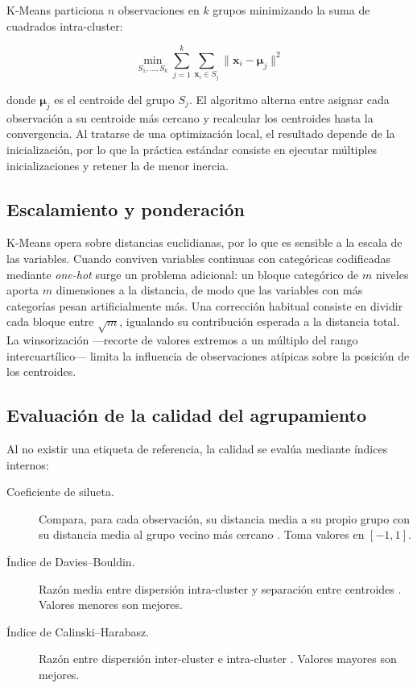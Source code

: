 K-Means \cite{macqueen1967some, lloyd1982least} particiona $n$ observaciones en $k$
grupos minimizando la suma de cuadrados intra-cluster:

\begin{equation}
\min_{S_1,\dots,S_k} \sum_{j=1}^{k} \sum_{\mathbf{x}_i \in S_j} \|\mathbf{x}_i - \boldsymbol{\mu}_j\|^2
\end{equation}

donde $\boldsymbol{\mu}_j$ es el centroide del grupo $S_j$. El algoritmo alterna
entre asignar cada observación a su centroide más cercano y recalcular los
centroides hasta la convergencia. Al tratarse de una optimización local, el
resultado depende de la inicialización, por lo que la práctica estándar consiste en
ejecutar múltiples inicializaciones y retener la de menor inercia.

\subsection{Escalamiento y ponderación}

K-Means opera sobre distancias euclidianas, por lo que es sensible a la escala de
las variables. Cuando conviven variables continuas con categóricas codificadas
mediante \emph{one-hot} surge un problema adicional: un bloque categórico de $m$
niveles aporta $m$ dimensiones a la distancia, de modo que las variables con más
categorías pesan artificialmente más. Una corrección habitual consiste en dividir
cada bloque entre $\sqrt{m}$, igualando su contribución esperada a la distancia
total. La winsorización —recorte de valores extremos a un múltiplo del rango
intercuartílico— limita la influencia de observaciones atípicas sobre la posición de
los centroides.

\subsection{Evaluación de la calidad del agrupamiento}

Al no existir una etiqueta de referencia, la calidad se evalúa mediante índices
internos:

\begin{description}
    \item[Coeficiente de silueta.] Compara, para cada observación, su distancia media
    a su propio grupo con su distancia media al grupo vecino más cercano
    \cite{rousseeuw1987silhouettes}. Toma valores en $[-1,1]$.
    \item[Índice de Davies--Bouldin.] Razón media entre dispersión intra-cluster y
    separación entre centroides \cite{davies1979cluster}. Valores menores son
    mejores.
    \item[Índice de Calinski--Harabasz.] Razón entre dispersión inter-cluster e
    intra-cluster \cite{calinski1974dendrite}. Valores mayores son mejores.
\end{description}

